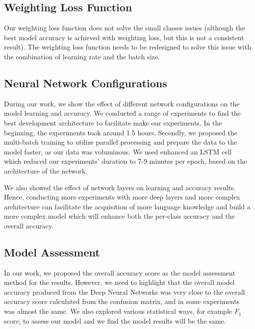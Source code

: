 \subsection{Weighting Loss Function}
Our weighting loss function does not solve the small classes issues (although the best model accuracy is achieved with weighting loss, but this is not a consistent result). The weighting loss function needs to be redesigned to solve this issue with the combination of learning rate and the batch size.

\subsection{Neural Network Configurations}

During our work, we show the effect of different network configurations on the model learning and accuracy. We conducted a range of experiments to find the best development architecture to facilitate make our experiments. In the beginning, the experiments took around 1.5 hours. Secondly, we proposed the multi-batch training to utilize parallel processing and prepare the data to the model faster, as our data was voluminous. We used enhanced an LSTM cell which reduced our experiments’ duration to 7-9 minutes per epoch, based on the architecture of the network.


We also showed the effect of network layers on learning and accuracy results. Hence, conducting more experiments with more deep layers and more complex architecture can facilitate the acquisition of more language knowledge and build a more complex model which will enhance both the per-class accuracy and the overall accuracy.

\subsection{Model Assessment}
In our work, we proposed the overall accuracy score as the model assessment method for the results. However, we need to highlight that the overall model accuracy produced from the Deep Neural Networks was very close to the overall accuracy score calculated from the confusion matrix, and in some experiments was almost the same. We also explored various statistical ways, for example $F_1$ score, to assess our model and we find the model results will be the same.

